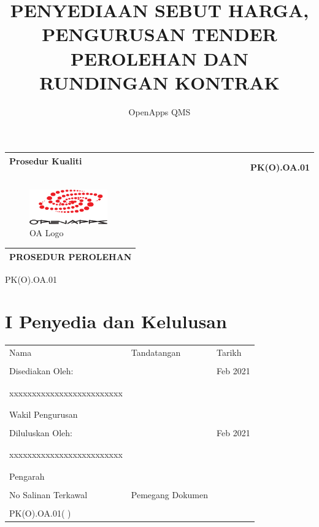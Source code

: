 \documentclass[
]{article}
\title{PENYEDIAAN SEBUT HARGA, PENGURUSAN TENDER PEROLEHAN DAN RUNDINGAN
KONTRAK}
\author{OpenApps QMS}
\date{}
\begin{document}
\maketitle

{
\setcounter{tocdepth}{4}
\tableofcontents
}
\newpage

\begin{longtable}[]{@{}lr@{}}
\toprule
\begin{minipage}[b]{0.66\columnwidth}\raggedright
Prosedur Kualiti ~ ~ ~ ~ ~ ~ ~ ~ ~ ~~ ~ ~ ~ ~ ~ ~ ~ ~ ~~ ~ ~ ~ ~ ~ ~ ~ ~
~~ ~ ~ ~ ~ ~ ~ ~ ~ ~\strut
\end{minipage} & \begin{minipage}[b]{0.28\columnwidth}\raggedleft
PK(O).OA.01\strut
\end{minipage}\tabularnewline
\midrule
\endhead
\bottomrule
\end{longtable}

\begin{figure}
\centering
\includegraphics[width=0.3\textwidth,height=\textheight]{media/openapps-logo.png}
\caption{OA Logo}
\end{figure}

\begin{longtable}[]{@{}c@{}}
\toprule
\endhead
PROSEDUR PEROLEHAN\tabularnewline
\bottomrule
\end{longtable}

PK(O).OA.01

\hypertarget{i-penyedia-dan-kelulusan}{%
\section{I Penyedia dan Kelulusan}\label{i-penyedia-dan-kelulusan}}

\begin{longtable}[]{@{}lll@{}}
\toprule
\endhead
Nama & Tandatangan & Tarikh\tabularnewline
& &\tabularnewline
Disediakan Oleh: & & Feb 2021\tabularnewline
& &\tabularnewline
& &\tabularnewline
xxxxxxxxxxxxxxxxxxxxxxxxx & &\tabularnewline
& &\tabularnewline
& &\tabularnewline
Wakil Pengurusan & &\tabularnewline
& &\tabularnewline
Diluluskan Oleh: & & Feb 2021\tabularnewline
& &\tabularnewline
& &\tabularnewline
xxxxxxxxxxxxxxxxxxxxxxxxx & &\tabularnewline
& &\tabularnewline
& &\tabularnewline
Pengarah & &\tabularnewline
& &\tabularnewline
No Salinan Terkawal & Pemegang Dokumen &\tabularnewline
& &\tabularnewline
PK(O).OA.01( ) & &\tabularnewline
\bottomrule
\end{longtable}
\end{document}
